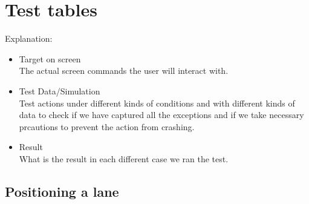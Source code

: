 \section{Test tables}
Explanation: 
\begin{itemize}
	\item Target on screen\\
	The actual screen commands the user will interact with.
	\item Test Data/Simulation\\
	Test actions under different kinds of conditions and with different kinds of data to check if we have captured all the exceptions and if we take necessary prcautions to prevent the action from crashing.
	\item Result\\
	What is the result in each different case we ran the test.
\end{itemize}

\newpage

\subsection{Positioning a lane}

